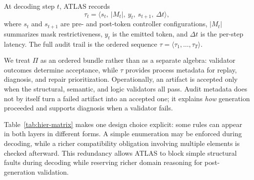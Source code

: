\documentclass[acmlarge,nonacm]{acmart}
\theoremstyle{acmplain}
\theoremstyle{acmdefinition}
\begin{document}
At decoding step $t$, ATLAS records
\[
\tau_t=\langle s_t,\ |M_t|,\ y_t,\ s_{t+1},\ \Delta t \rangle,
\]
where $s_t$ and $s_{t+1}$ are pre- and post-token controller configurations, $|M_t|$ summarizes mask restrictiveness, $y_t$ is the emitted token, and $\Delta t$ is the per-step latency. The full audit trail is the ordered sequence $\tau=\langle \tau_1,\ldots,\tau_T\rangle$.

We treat $\Pi$ as an ordered bundle rather than as a separate algebra: validator outcomes determine acceptance, while $\tau$ provides process metadata for replay, diagnosis, and repair prioritization. Operationally, an artifact is accepted only when the structural, semantic, and logic validators all pass. Audit metadata does not by itself turn a failed artifact into an accepted one; it explains \emph{how} generation proceeded and supports diagnosis when a validator fails.

\begin{table}[!htbp]
\centering
\small
\caption{Constraint hierarchy and evidence mapping.
Each constraint family is enforced at its natural layer and emits a corresponding audit/validation artifact.}
\label{tab:hier-matrix}
\end{table}

Table~\ref{tab:hier-matrix} makes one design choice explicit: some rules can appear in both layers in different forms. A simple enumeration may be enforced during decoding, while a richer compatibility obligation involving multiple elements is checked afterward. This redundancy allows ATLAS to block simple structural faults during decoding while reserving richer domain reasoning for post-generation validation.
\end{document}
